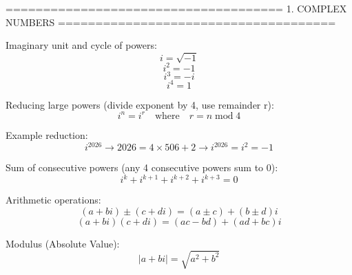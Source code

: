 =====================================
1. COMPLEX NUMBERS
=====================================

Imaginary unit and cycle of powers:
$$i = \sqrt{-1}$$
$$i^2 = -1$$
$$i^3 = -i$$
$$i^4 = 1$$

Reducing large powers (divide exponent by 4, use remainder r):
$$i^n = i^r \quad \text{where} \quad r = n \;\text{mod}\; 4$$

Example reduction:
$$i^{2026} \to 2026 = 4 \times 506 + 2 \to i^{2026} = i^2 = -1$$

Sum of consecutive powers (any 4 consecutive powers sum to 0):
$$i^k + i^{k+1} + i^{k+2} + i^{k+3} = 0$$

Arithmetic operations:
$$(a + bi) \pm (c + di) = (a \pm c) + (b \pm d)i$$
$$(a + bi)(c + di) = (ac - bd) + (ad + bc)i$$

Modulus (Absolute Value):
$$\left| a + bi \right| = \sqrt{a^2 + b^2}$$
